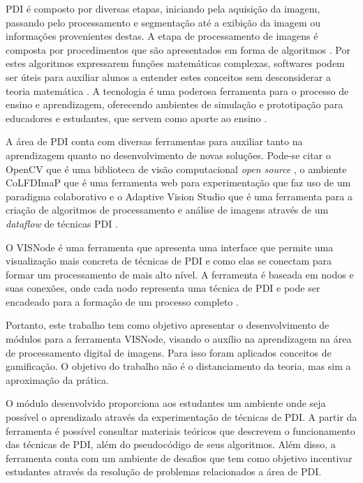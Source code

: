 \documentclass[
	12pt,				%
	oneside,			%
	a4paper,			%
	english,			%
	french,				%
	spanish,			%
	brazil,				%
	]{abntex2}
\begin{document}
PDI é composto por diversas etapas, iniciando pela aquisição da imagem, passando pelo processamento e segmentação até a exibição da imagem ou informações provenientes destas. A etapa de processamento de imagens é composta por procedimentos que são apresentados em forma de algoritmos \cite{gonzalesWoods:2008}. Por estes algoritmos expressarem funções matemáticas complexas, softwares podem ser úteis para auxiliar alunos a entender estes conceitos sem desconsiderar a teoria matemática \cite{lopez2016teaching}. A tecnologia é uma poderosa ferramenta para o processo de ensino e aprendizagem, oferecendo ambientes de simulação e prototipação para educadores e estudantes, que servem como aporte ao ensino \cite{henderson2017works}.

A área de PDI conta com diversas ferramentas para auxiliar tanto na aprendizagem quanto no desenvolvimento de novas soluções. Pode-se citar o OpenCV que é uma biblioteca de visão computacional \textit{open source} \cite{pulli2012realtime}, o ambiente CoLFDImaP que é uma ferramenta web para experimentação que faz uso de um paradigma colaborativo \cite{garcia2015colfdimap} e o Adaptive Vision Studio que é uma ferramenta para a criação de algoritmos de processamento e análise de imagens através de um \textit{dataflow} de técnicas PDI \cite{radlak2015adaptive}.

O VISNode é uma ferramenta que apresenta uma interface que permite uma visualização mais concreta de técnicas de PDI e como elas se conectam para formar um processamento de mais alto nível. A ferramenta é baseada em nodos e suas conexões, onde cada nodo representa uma técnica de PDI e pode ser encadeado para a  formação de um processo completo  \cite{visnode}.

Portanto, este trabalho tem como objetivo apresentar o desenvolvimento de módulos para a ferramenta VISNode, visando o auxílio na aprendizagem na área de processamento digital de imagens. Para isso foram aplicados conceitos de gamificação. O objetivo do trabalho não é o distanciamento da teoria, mas sim a aproximação da prática.

O módulo desenvolvido proporciona aos estudantes um ambiente onde seja possível o aprendizado através da experimentação de técnicas de PDI. A partir da ferramenta é possível consultar materiais teóricos que descrevem o funcionamento das técnicas de PDI, além do pseudocódigo de seus algoritmos. Além disso, a ferramenta conta com um ambiente de desafios que tem como objetivo incentivar estudantes através da resolução de problemas relacionados a área de PDI.
\end{document}
